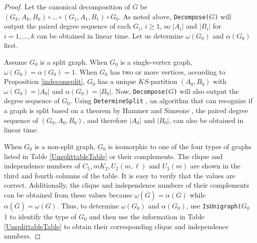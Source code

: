 \documentclass[11pt]{article}
\begin{document}
\begin{proof}
Let the canonical decomposition of $G$ be $(G_k , A_k, B_k) \circ \hdots \circ (G_1, A_1, B_1) \circ G_0.$   As noted above, {\tt Decompose($G$)} will output the paired degree sequence of each $G_i$, $i \ge 1$,  so  $|A_i|$ and $|B_i|$ for $i = 1, \hdots, k$ can be obtained in linear time.   Let us determine $\omega(G_0)$ and $\alpha(G_0)$ first.

Assume $G_0$  is a split graph.  When $G_0$ is a single-vertex graph,  $\omega(G_0) = \alpha(G_0) = 1$.  When $G_0$ has two or more vertices,  according to Proposition \ref{indecomsplit}, $G_0$ has a unique $KS$-partition $(A_0, B_0)$ with $\omega(G_0) = |A_0|$ and $\alpha(G_0) = |B_0|$.   Now, {\tt Decompose($G$)} will also output the degree sequence of $G_0$.  Using {\tt DetermineSplit} \cite{Ch25}, an algorithm that can recognize if a graph is split based on a theorem by Hammer and Simeone \cite{HaSi81}, the paired degree sequence of $(G_0, A_0, B_0)$, and therefore $|A_0|$ and $|B_0|$,  can also be obtained in linear time.  %






 
 
 When $G_0$ is a non-split graph,  $G_0$  is isomorphic to one of the four types of graphs listed in Table \ref{UnsplittableTable} or their complements.  The clique and independence numbers of $C_5, mK_2, U_2(m, \ell)$ and $U_3(m)$ 
 are shown in the third and fourth columns of the table.  It is easy to verify that the values are correct. Additionally, the clique and independence numbers of their complements can be obtained from these values because $\omega(\overline{G}) = \alpha(G)$ while $\alpha(\overline{G}) = \omega(G)$.   Thus, to determine $\omega(G_0)$ and $\alpha(G_0)$, use {\tt IsUnigraph($G_0$)} to identify the type of $G_0$ and then use the information in Table \ref{UnsplittableTable} to obtain their corresponding clique and independence numbers.
 

\end{proof}
\end{document}
